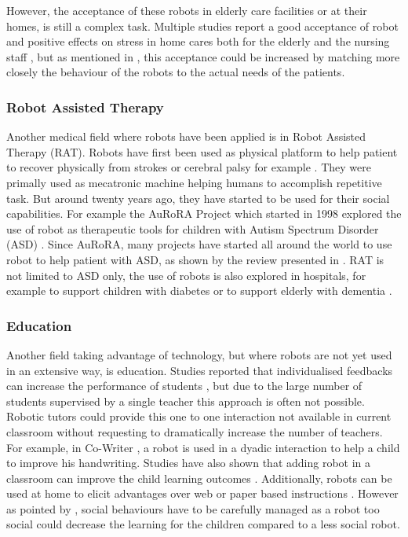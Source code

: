     However, the acceptance of these robots in elderly care facilities or at
    their homes, is still a complex task. Multiple studies report a good
    acceptance of robot and positive effects on stress in home cares both for
    the elderly and the nursing staff \citep{wada2004effects}, but as mentioned
    in \citep{broadbent2009acceptance}, this acceptance could be increased by
    matching more closely the behaviour of the robots to the actual needs of the
    patients.	
		
\subsubsection{Robot Assisted Therapy}
	
    Another medical field where robots have been applied is in Robot Assisted
    Therapy (RAT). Robots have first been used as physical platform to help
    patient to recover physically from strokes or cerebral palsy for example
    \citep{sivan2011systematic}. They were primally used as mecatronic machine
    helping humans to accomplish repetitive task. But around twenty years ago,
    they have started to be used for their social capabilities. For example the
    AuRoRA Project
    which started in 1998 explored the use of robot as therapeutic tools for
    children with Autism Spectrum Disorder (ASD) \citep{dautenhahn1999robots}.
    Since AuRoRA, many projects have started all around the world to use robot
    to help patient with ASD, as shown by the review presented in
    \citep{diehl2012clinical}. RAT is not limited to ASD only, the use of robots
    is also explored in hospitals, for example to support children with diabetes
    \citep{belpaeme2012multimodal} or to support elderly with dementia
    \citep{wada2005psychological}.	
	
\subsubsection{Education} 

    Another field taking advantage of technology, but where robots are not yet
    used in an extensive way, is education. Studies reported that individualised
    feedbacks can increase the performance of students \citep{bloom19842}, but
    due to the large number of students supervised by a single teacher this
    approach is often not possible. Robotic tutors could provide this one to one
    interaction not available in current classroom without requesting to
    dramatically increase the number of teachers. For example, in Co-Writer
    \citep{hood2015children}, a robot is used in a dyadic interaction to help a
    child to improve his handwriting. Studies have also shown that adding robot
    in a classroom can improve the child learning outcomes
    \citep{kanda2004interactive}. Additionally, robots can be used at home to
    elicit advantages over web or paper based instructions
    \citep{han2005educational}. However as pointed by \citet{kennedy2015robot},
    social behaviours have to be carefully managed as a robot too social could
    decrease the learning for the children compared to a less social robot. 
	
